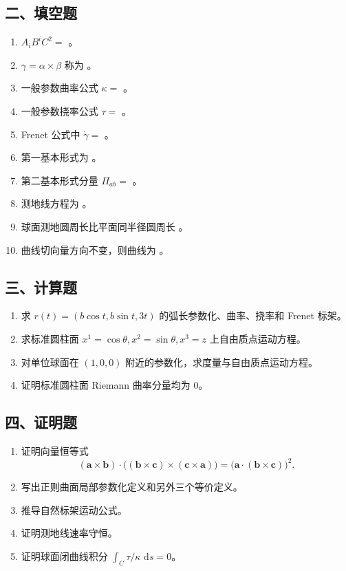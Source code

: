\documentclass[UTF8,12pt,a4paper]{ctexart}
\newcommand{\dd}{\,\mathrm d}
\newcommand{\vct}[1]{\boldsymbol{#1}}
\begin{document}
\subsection*{二、填空题}
\begin{enumerate}
\item $A_iB^iC^2=$ \underline{\hspace{4cm}}。
\item $\gamma=\alpha\times\beta$ 称为 \underline{\hspace{4cm}}。
\item 一般参数曲率公式 $\kappa=$ \underline{\hspace{5cm}}。
\item 一般参数挠率公式 $\tau=$ \underline{\hspace{5cm}}。
\item Frenet 公式中 $\dot\gamma=$ \underline{\hspace{4cm}}。
\item 第一基本形式为 \underline{\hspace{5cm}}。
\item 第二基本形式分量 $\Pi_{ab}=$ \underline{\hspace{5cm}}。
\item 测地线方程为 \underline{\hspace{5cm}}。
\item 球面测地圆周长比平面同半径圆周长 \underline{\hspace{2cm}}。
\item 曲线切向量方向不变，则曲线为 \underline{\hspace{2cm}}。
\end{enumerate}

\subsection*{三、计算题}
\begin{enumerate}
\item 求 $r(t)=(b\cos t,b\sin t,3t)$ 的弧长参数化、曲率、挠率和 Frenet 标架。
\item 求标准圆柱面 $x^1=\cos\theta,x^2=\sin\theta,x^3=z$ 上自由质点运动方程。
\item 对单位球面在 $(1,0,0)$ 附近的参数化，求度量与自由质点运动方程。
\item 证明标准圆柱面 Riemann 曲率分量均为 $0$。
\end{enumerate}

\subsection*{四、证明题}
\begin{enumerate}
\item 证明向量恒等式
\[
(\vct a\times\vct b)\cdot\bigl((\vct b\times\vct c)\times(\vct c\times\vct a)\bigr)
=\bigl(\vct a\cdot(\vct b\times\vct c)\bigr)^2.
\]
\item 写出正则曲面局部参数化定义和另外三个等价定义。
\item 推导自然标架运动公式。
\item 证明测地线速率守恒。
\item 证明球面闭曲线积分 $\int_C\tau/\kappa\,\dd s=0$。
\end{enumerate}
\end{document}
